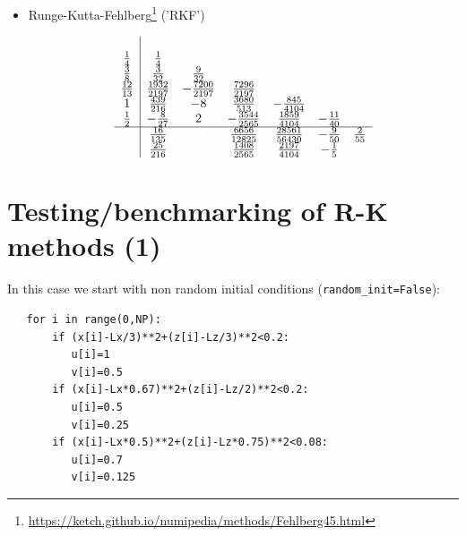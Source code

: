 \begin{itemize}
\item Runge-Kutta-Fehlberg\footnote{\url{https://ketch.github.io/numipedia/methods/Fehlberg45.html}} ('RKF')

\begin{align} 
\begin{array}{c|cccccc} 
& & & & & & \\ 
\frac{1}{4} & \frac{1}{4} & & & & & \\ 
\frac{3}{8} & \frac{3}{32} & \frac{9}{32} & & & & \\ 
\frac{12}{13} & \frac{1932}{2197} & - \frac{7200}{2197} & \frac{7296}{2197} & & & \\ 
1 & \frac{439}{216} & -8 & \frac{3680}{513} & - \frac{845}{4104} & & \\ 
\frac{1}{2} & - \frac{8}{27} & 2 & - \frac{3544}{2565} & \frac{1859}{4104} & - \frac{11}{40} & \\ 
\hline & \frac{16}{135} & & \frac{6656}{12825} & \frac{28561}{56430} & - \frac{9}{50} & \frac{2}{55}\\ 
& \frac{25}{216} & & \frac{1408}{2565} & \frac{2197}{4104} & - \frac{1}{5} & 
\end{array}
\end{align}





\end{itemize}



\newpage
\section*{Testing/benchmarking of R-K methods (1)}

In this case we start with non random initial conditions (\lstinline{random_init=False}):
\begin{lstlisting}
   for i in range(0,NP):
       if (x[i]-Lx/3)**2+(z[i]-Lz/3)**2<0.2:
          u[i]=1
          v[i]=0.5
       if (x[i]-Lx*0.67)**2+(z[i]-Lz/2)**2<0.2:
          u[i]=0.5
          v[i]=0.25
       if (x[i]-Lx*0.5)**2+(z[i]-Lz*0.75)**2<0.08:
          u[i]=0.7
          v[i]=0.125
\end{lstlisting}

